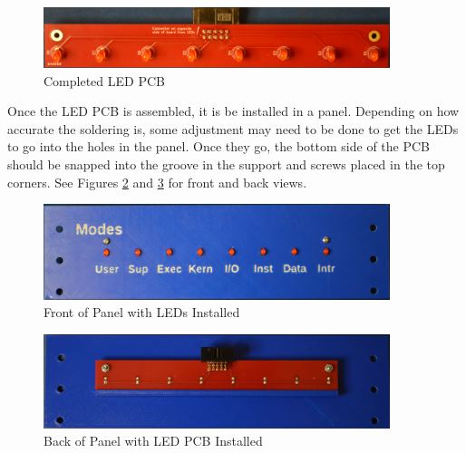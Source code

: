 \documentclass[10pt, openany]{book}
\begin{document}
\begin{figure}[ht!]
  \centering
  \includegraphics[width=0.9\textwidth]{../Pict/LED-Final.jpg}
  \caption{Completed LED PCB}
  \label{fig:LEDFinal}
\end{figure}

Once the LED PCB is assembled, it is be installed in a panel.  Depending on how accurate the soldering is, some adjustment may need to be done to get the LEDs to go into the holes in the panel.  Once they go, the bottom side of the PCB should be snapped into the groove in the support and screws placed in the top corners.  See Figures \ref{fig:PanelFront} and \ref{fig:PanelBack} for front and back views.

\begin{figure}[ht!]
  \centering
  \includegraphics[width=0.9\textwidth]{../Pict/Panel-Front.jpg}
  \caption{Front of Panel with LEDs Installed}
  \label{fig:PanelFront}
\end{figure}

\begin{figure}[ht!]
  \centering
  \includegraphics[width=0.9\textwidth]{../Pict/Panel-Back.jpg}
  \caption{Back of Panel with LED PCB Installed}
  \label{fig:PanelBack}
\end{figure}

\clearpage
\end{document}
